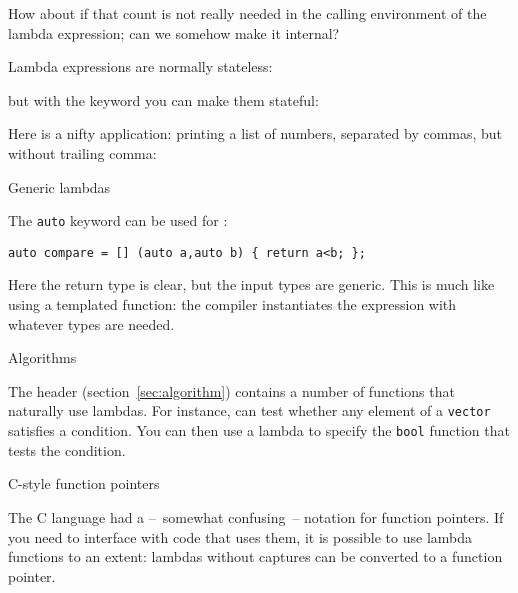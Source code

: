 How about if that count is not really needed
in the calling environment of the lambda expression;
can we somehow make it internal?

Lambda expressions are normally stateless:


but with the  keyword you can
make them stateful:


Here is a nifty application: printing a list of numbers,
separated by commas, but without trailing comma:
%

 {Generic lambdas}
\label{sec:lambda-generic}

The \lstinline{auto} keyword can be used for
:
\begin{lstlisting}
auto compare = [] (auto a,auto b) { return a<b; };
\end{lstlisting}
Here the return type is clear, but the input types are generic.
This is much like using a templated function:
the compiler instantiates the expression with whatever types are needed.

 {Algorithms}

The  header (section~\ref{sec:algorithm})
contains a number of functions that
naturally use lambdas. For instance,  can test
whether any element of a \lstinline{vector} satisfies a condition.
You can then use a lambda to specify the \lstinline{bool} function
that tests the condition.

 {C-style function pointers}

The C language had a --~somewhat confusing~-- notation
for function pointers.
If you need to interface with code that uses them,
it is possible to use lambda functions to an extent:
lambdas without captures can be converted to a function pointer.

